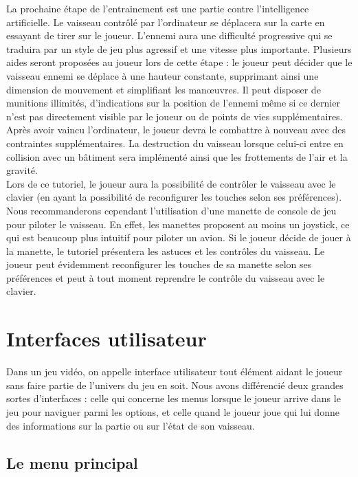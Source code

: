 \documentclass[12pt, titlepage]{article}
\begin{document}
\begin{spacing}{1.5}
 La prochaine étape de l'entrainement est une partie contre l'intelligence artificielle. Le vaisseau contrôlé par l'ordinateur se déplacera sur la carte en essayant de tirer sur le joueur. L'ennemi aura une difficulté progressive qui se traduira par un style de jeu plus agressif et une vitesse plus importante. Plusieurs aides seront proposées au joueur lors de cette étape : le joueur peut décider que le vaisseau ennemi se déplace à une hauteur constante, supprimant ainsi une dimension de mouvement et simplifiant les manœuvres. Il peut disposer de munitions illimités, d'indications sur la position de l'ennemi même si ce dernier n'est pas directement visible par le joueur ou de points de vies supplémentaires. \\

Après avoir vaincu l'ordinateur, le joueur devra le combattre à nouveau avec des contraintes supplémentaires. La destruction du vaisseau lorsque celui-ci entre en collision avec un bâtiment sera implémenté ainsi que les frottements de l'air et la gravité. \\

Lors de ce tutoriel, le joueur aura la possibilité de contrôler le vaisseau avec le clavier (en ayant la possibilité de reconfigurer les touches selon ses préférences). Nous recommanderons cependant l'utilisation d'une manette de console de jeu pour piloter le vaisseau. En effet, les manettes proposent au moins un joystick, ce qui est beaucoup plus intuitif pour piloter un avion. Si le joueur décide de jouer à la manette, le tutoriel présentera les astuces et les contrôles du vaisseau. Le joueur peut évidemment reconfigurer les touches de sa manette selon ses préférences et peut à tout moment reprendre le contrôle du vaisseau avec le clavier.\\

\newpage
\section{Interfaces utilisateur}

Dans un jeu vidéo, on appelle interface utilisateur tout élément aidant le joueur sans faire partie de l'univers du jeu en soit. Nous avons différencié deux grandes sortes d'interfaces : celle qui concerne les menus lorsque le joueur arrive dans le jeu pour naviguer parmi les options, et celle quand le joueur joue qui lui donne des informations sur la partie ou sur l'état de son vaisseau.

\subsection{Le menu principal}


\end{spacing}
\end{document}
